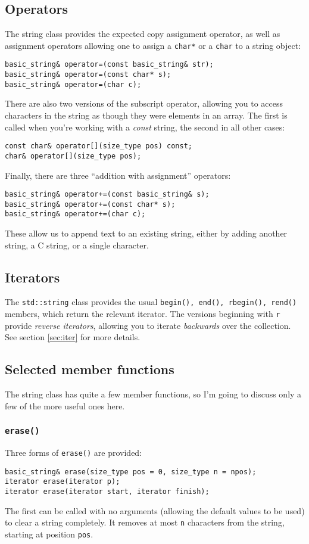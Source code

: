 \documentclass[a4paper]{scrartcl}
\begin{document}
\subsection{Operators}
The string class provides the expected copy assignment operator, as well as assignment operators allowing one to assign a \texttt{char*} or a \texttt{char} to a string object:
\begin{verbatim}
basic_string& operator=(const basic_string& str);
basic_string& operator=(const char* s);
basic_string& operator=(char c);
\end{verbatim}

There are also two versions of the subscript operator, allowing you to access characters in the string as though they were elements in an array. The first is called when you're working with a \emph{const} string, the second in all other cases:
\begin{verbatim}
const char& operator[](size_type pos) const;
char& operator[](size_type pos);
\end{verbatim}

Finally, there are three ``addition with assignment'' operators:
\begin{verbatim}
basic_string& operator+=(const basic_string& s);
basic_string& operator+=(const char* s);
basic_string& operator+=(char c);
\end{verbatim}
These allow us to append text to an existing string, either by adding another string, a C string, or a single character.

\subsection{Iterators}
The \texttt{std::string} class provides the usual \texttt{begin(), end(), rbegin(), rend()} members, which return the relevant iterator. The versions beginning with \texttt{r} provide \emph{reverse iterators}, allowing you to iterate \emph{backwards} over the collection. See section \ref{sec:iter} for more details.

\subsection{Selected member functions}
The string class has quite a few member functions, so I'm going to discuss only a few of the more useful ones here.

\subsubsection{\texttt{erase()}}
Three forms of \texttt{erase()} are provided:
\begin{verbatim}
basic_string& erase(size_type pos = 0, size_type n = npos);
iterator erase(iterator p);
iterator erase(iterator start, iterator finish);
\end{verbatim}
The first can be called with no arguments (allowing the default values to be used) to clear a string completely. It removes at most \texttt{n} characters from the string, starting at position \texttt{pos}.
\end{document}

